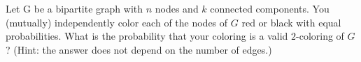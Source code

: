 \documentclass[12pt,oneside]{article}
\begin{document}
\begin{problem}{10}
Let G be a bipartite graph with $n$ nodes and $k$ connected components. You (mutually) independently color each of the nodes of $G$ red or black with equal probabilities. What is the probability that your coloring is a valid $2$-coloring of $G$? (Hint: the answer does not depend on the number of edges.)
\end{problem}
\newpage

\end{document}

